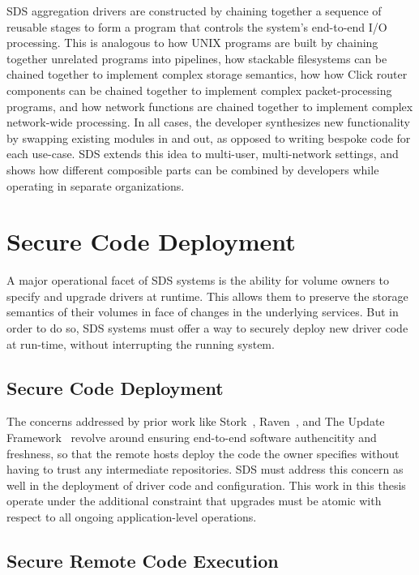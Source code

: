 SDS aggregation drivers are constructed by chaining together a sequence of
reusable stages to form a program that controls the system's
end-to-end I/O processing.  This is analogous to how UNIX programs are built
by chaining together unrelated programs into pipelines, how stackable
filesystems can be chained together to implement complex storage semantics, how
how Click router components can be chained together to implement complex
packet-processing programs, and how network functions are chained together to
implement complex network-wide processing.
In all cases, the developer synthesizes new functionality by swapping existing
modules in and out, as opposed to writing bespoke code for each use-case.
SDS extends this idea to multi-user, multi-network settings, and shows how different
composible parts can be combined by developers
while operating in separate organizations.

\section{Secure Code Deployment}

A major operational facet of SDS systems is the ability for volume owners
to specify and upgrade drivers at runtime.  This allows them to preserve the
storage semantics of their volumes in face of changes in the underlying
services.  But in order to do so, SDS systems must offer a way to securely
deploy new driver code at run-time, without interrupting the running system.

\subsection{Secure Code Deployment}

The concerns addressed by prior work like Stork~\cite{stork},
Raven~\cite{raven}, and The Update Framework~\cite{TUF}
revolve around ensuring end-to-end software authencitity and
freshness, so that the remote hosts deploy the code the owner specifies without
having to trust any intermediate repositories.
SDS must address this concern as
well in the deployment of driver code and configuration.  This work in this
thesis operate under the additional constraint that upgrades must be atomic with
respect to all ongoing application-level operations.

\subsection{Secure Remote Code Execution}

